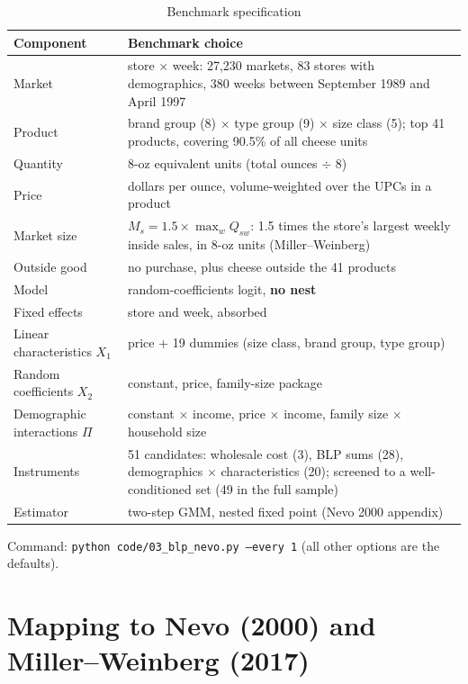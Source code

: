 \documentclass[11pt]{article}
\newcommand{\code}[1]{\texttt{#1}}
\begin{document}
\begin{table}[htbp]
\centering
\small
\caption{Benchmark specification}\label{tab:glance}
\begin{tabularx}{\textwidth}{@{}lL@{}}
\toprule
Component & Benchmark choice \\
\midrule
Market & store $\times$ week: 27,230 markets, 83 stores with demographics, 380 weeks between
         September 1989 and April 1997 \\
Product & brand group (8) $\times$ type group (9) $\times$ size class (5); top 41 products,
          covering 90.5\% of all cheese units \\
Quantity & 8-oz equivalent units (total ounces $\div$ 8) \\
Price & dollars per ounce, volume-weighted over the UPCs in a product \\
Market size & $M_s = 1.5 \times \max_w Q_{sw}$: 1.5 times the store's largest weekly inside
              sales, in 8-oz units (Miller--Weinberg) \\
Outside good & no purchase, plus cheese outside the 41 products \\
Model & random-coefficients logit, \textbf{no nest} \\
Fixed effects & store and week, absorbed \\
Linear characteristics $X_1$ & price + 19 dummies (size class, brand group, type group) \\
Random coefficients $X_2$ & constant, price, family-size package \\
Demographic interactions $\Pi$ & constant $\times$ income, price $\times$ income, family size
                                 $\times$ household size \\
Instruments & 51 candidates: wholesale cost (3), BLP sums (28), demographics $\times$
              characteristics (20); screened to a well-conditioned set (49 in the full sample) \\
Estimator & two-step GMM, nested fixed point (Nevo 2000 appendix) \\
\bottomrule
\end{tabularx}
\end{table}

Command: \code{python code/03\_blp\_nevo.py --every 1} (all other options are the defaults).

\section{Mapping to Nevo (2000) and Miller--Weinberg (2017)}\label{sec:mapping}
\end{document}
